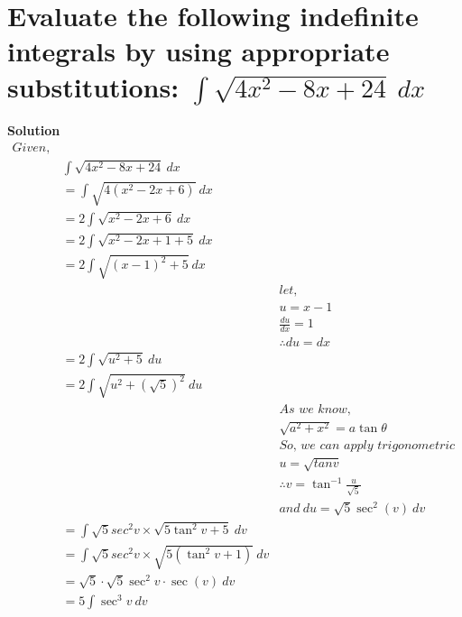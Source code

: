 \documentclass[12pt]{article}
\begin{document}


\section{Evaluate the following indefinite integrals by using appropriate substitutions: $\int \sqrt{4x^2 - 8x + 24} \ dx$}
\textbf{Solution}
\begin{align*}
    Given,&\\
    &\int \sqrt{4x^2 - 8x + 24} \ dx\\
    &= \int \sqrt{4(x^2-2x+6)} \ dx\\
    &= 2\int \sqrt{x^2-2x+6} \ dx\\
    &= 2\int \sqrt{x^2-2x+1+5} \ dx\\
    &= 2\int \sqrt{(x-1)^2+5} \ dx\\
    & &let,\\
    & & u=x-1\\
    & & \frac{du}{dx}=1\\
    & & \therefore du=dx\\
    &= 2\int \sqrt{u^2+5} \ du\\
    &= 2\int \sqrt{u^2+(\sqrt{5})^2} \ du\\
    & &\textit{As we know,}\\
    & &\sqrt{a^2+x^2}=a\tan\theta\\
    & &\textit{So, we can apply trigonometric formula here,}\\
    & &u=\sqrt{tanv}\\
    & &\therefore v=\tan^{-1}\frac{u}{\sqrt{5}}\\
    & & and \ du=\sqrt{5} \sec^2(v) \ dv \\
    &=\int \sqrt{5} sec^2v \times \sqrt{5 \tan^2v+5} \ dv\\
    &=\int \sqrt{5} sec^2v \times \sqrt{5(\tan^2v+1)} \ dv\\
    &=\sqrt{5} \cdot \sqrt{5} \sec^2v \cdot \sec (v) \ dv \\
    &= 5\int \sec^3v \ dv
\end{align*}
\end{document}
